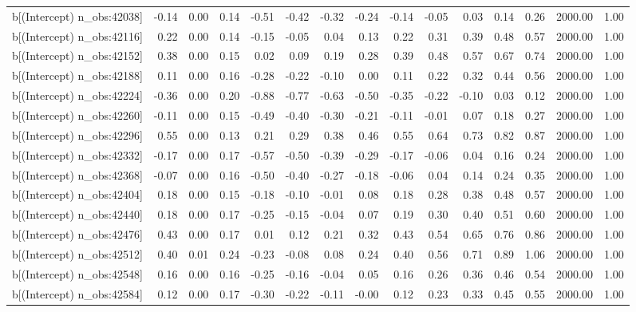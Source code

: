 \begin{table}[ht]
\begin{tabular}{rrrrrrrrrrrrrrr}
  b[(Intercept) n\_obs:42038] & -0.14 & 0.00 & 0.14 & -0.51 & -0.42 & -0.32 & -0.24 & -0.14 & -0.05 & 0.03 & 0.14 & 0.26 & 2000.00 & 1.00 \\ 
  b[(Intercept) n\_obs:42116] & 0.22 & 0.00 & 0.14 & -0.15 & -0.05 & 0.04 & 0.13 & 0.22 & 0.31 & 0.39 & 0.48 & 0.57 & 2000.00 & 1.00 \\ 
  b[(Intercept) n\_obs:42152] & 0.38 & 0.00 & 0.15 & 0.02 & 0.09 & 0.19 & 0.28 & 0.39 & 0.48 & 0.57 & 0.67 & 0.74 & 2000.00 & 1.00 \\ 
  b[(Intercept) n\_obs:42188] & 0.11 & 0.00 & 0.16 & -0.28 & -0.22 & -0.10 & 0.00 & 0.11 & 0.22 & 0.32 & 0.44 & 0.56 & 2000.00 & 1.00 \\ 
  b[(Intercept) n\_obs:42224] & -0.36 & 0.00 & 0.20 & -0.88 & -0.77 & -0.63 & -0.50 & -0.35 & -0.22 & -0.10 & 0.03 & 0.12 & 2000.00 & 1.00 \\ 
  b[(Intercept) n\_obs:42260] & -0.11 & 0.00 & 0.15 & -0.49 & -0.40 & -0.30 & -0.21 & -0.11 & -0.01 & 0.07 & 0.18 & 0.27 & 2000.00 & 1.00 \\ 
  b[(Intercept) n\_obs:42296] & 0.55 & 0.00 & 0.13 & 0.21 & 0.29 & 0.38 & 0.46 & 0.55 & 0.64 & 0.73 & 0.82 & 0.87 & 2000.00 & 1.00 \\ 
  b[(Intercept) n\_obs:42332] & -0.17 & 0.00 & 0.17 & -0.57 & -0.50 & -0.39 & -0.29 & -0.17 & -0.06 & 0.04 & 0.16 & 0.24 & 2000.00 & 1.00 \\ 
  b[(Intercept) n\_obs:42368] & -0.07 & 0.00 & 0.16 & -0.50 & -0.40 & -0.27 & -0.18 & -0.06 & 0.04 & 0.14 & 0.24 & 0.35 & 2000.00 & 1.00 \\ 
  b[(Intercept) n\_obs:42404] & 0.18 & 0.00 & 0.15 & -0.18 & -0.10 & -0.01 & 0.08 & 0.18 & 0.28 & 0.38 & 0.48 & 0.57 & 2000.00 & 1.00 \\ 
  b[(Intercept) n\_obs:42440] & 0.18 & 0.00 & 0.17 & -0.25 & -0.15 & -0.04 & 0.07 & 0.19 & 0.30 & 0.40 & 0.51 & 0.60 & 2000.00 & 1.00 \\ 
  b[(Intercept) n\_obs:42476] & 0.43 & 0.00 & 0.17 & 0.01 & 0.12 & 0.21 & 0.32 & 0.43 & 0.54 & 0.65 & 0.76 & 0.86 & 2000.00 & 1.00 \\ 
  b[(Intercept) n\_obs:42512] & 0.40 & 0.01 & 0.24 & -0.23 & -0.08 & 0.08 & 0.24 & 0.40 & 0.56 & 0.71 & 0.89 & 1.06 & 2000.00 & 1.00 \\ 
  b[(Intercept) n\_obs:42548] & 0.16 & 0.00 & 0.16 & -0.25 & -0.16 & -0.04 & 0.05 & 0.16 & 0.26 & 0.36 & 0.46 & 0.54 & 2000.00 & 1.00 \\ 
  b[(Intercept) n\_obs:42584] & 0.12 & 0.00 & 0.17 & -0.30 & -0.22 & -0.11 & -0.00 & 0.12 & 0.23 & 0.33 & 0.45 & 0.55 & 2000.00 & 1.00 \\ 

\end{tabular}
\end{table}
